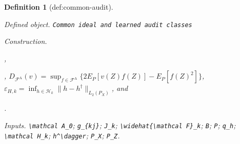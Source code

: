 \documentclass{article}
\newtheorem{definition}{Definition}
\begin{document}
\begin{definition}[def:common-audit]\label{def:common-audit}
\par\smallskip\noindent\emph{Defined object.} \texttt{Common ideal and learned audit classes}
\par\smallskip\noindent\emph{Construction.} \par\noindent {}\par\noindent, \par\noindent {}\par\noindent, \(D_{\mathcal F^{\mathrm A}}(v)=\sup_{f\in\mathcal F^{\mathrm A}}\{2E_P[v(Z)f(Z)]-E_P[f(Z)^2]\}\), \(\varepsilon_{H,k}=\inf_{h\in\mathcal H_k}\|h-h^\dagger\|_{L_2(P_X)}\), and \par\noindent {}\par\noindent.
\par\smallskip\noindent\emph{Inputs.} \texttt{\textbackslash{}\allowbreak{}mathcal A\_\allowbreak{}0}; \texttt{g\_\allowbreak{}\{kj\}\allowbreak{}}; \texttt{J\_\allowbreak{}k}; \texttt{\textbackslash{}\allowbreak{}widehat\{\textbackslash{}\allowbreak{}mathcal F\}\allowbreak{}\_\allowbreak{}k}; \texttt{B}; \texttt{P}; \texttt{q\_\allowbreak{}h}; \texttt{\textbackslash{}\allowbreak{}mathcal H\_\allowbreak{}k}; \texttt{h\textasciicircum{}\textbackslash{}\allowbreak{}dagger}; \texttt{P\_\allowbreak{}X}; \texttt{P\_\allowbreak{}Z}.
\end{definition}
\end{document}
